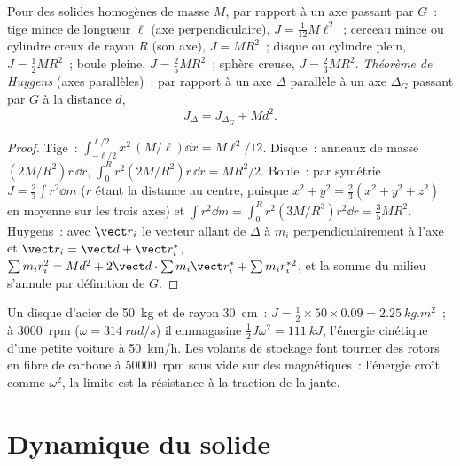 \begin{proposition}\label{prop:b2:rigid-body-mechanics:inertia}
Pour des solides homogènes de masse $M$, par rapport à un axe passant par $G$~: tige
mince de longueur $\ell$ (axe perpendiculaire), $J = \tfrac1{12}M\ell^2$~; cerceau
mince ou cylindre creux de rayon $R$ (son axe), $J = MR^2$~; disque ou cylindre
plein, $J = \tfrac12MR^2$~; boule pleine, $J = \tfrac25MR^2$~; sphère
creuse, $J = \tfrac23MR^2$. \emph{Théorème de Huygens} (axes parallèles)~: par rapport à
un axe $\Delta$ parallèle à un axe $\Delta_G$ passant par $G$ à la distance
$d$,
\[
J_\Delta = J_{\Delta_G} + Md^2 .
\]
\end{proposition}

\begin{proof}
Tige~: $\int_{-\ell/2}^{\ell/2}x^2\,(M/\ell)\dd x = M\ell^2/12$. Disque~: anneaux de
masse $(2M/R^2)r\,\dd r$, $\int_0^R r^2(2M/R^2)r\,\dd r = MR^2/2$. Boule~: par
symétrie $J = \tfrac23\int r^2\dd m$ ($r$ étant la distance au centre,
puisque $x^2 + y^2 = \tfrac23(x^2 + y^2 + z^2)$ en moyenne sur les trois
axes) et $\int r^2\dd m = \int_0^R r^2(3M/R^3)r^2\dd r = \tfrac35MR^2$.
Huygens~: avec $\vect r_i$ le vecteur allant de $\Delta$ à $m_i$ perpendiculairement
à l'axe et $\vect r_i = \vect d + \vect r_i^*$, $\sum m_ir_i^2 = Md^2
+ 2\vect d\cdot\sum m_i\vect r_i^* + \sum m_ir_i^{*2}$, et la somme du milieu
s'annule par définition de $G$.
\end{proof}

\begin{example}\label{ex:b2:rigid-body-mechanics:flywheel}
Un disque d'acier de \qty{50}{kg} et de rayon \qty{30}{cm}~: $J = \tfrac12 \times
50 \times 0.09 = \qty{2.25}{kg.m^2}$~; à \qty{3000}{rpm} ($\omega =
\qty{314}{rad/s}$) il emmagasine $\tfrac12J\omega^2 = \qty{111}{kJ}$, l'énergie
cinétique d'une petite voiture à \qty{50}{km/h}. Les volants de stockage
font tourner des rotors en fibre de carbone à \qty{50000}{rpm} sous vide sur des
 magnétiques~: l'énergie croît comme $\omega^2$, la limite est la
résistance à la traction de la jante.
\end{example}

\section{Dynamique du solide}

